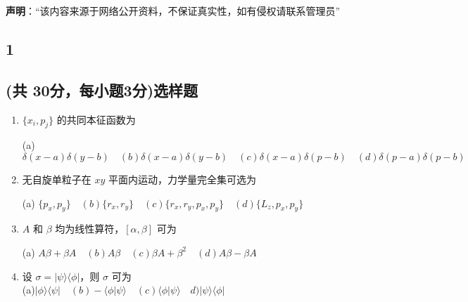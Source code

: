 
\textbf{声明}：“该内容来源于网络公开资料，不保证真实性，如有侵权请联系管理员”

\subsection{1}
\subsection{(共 30分，每小题3分)选样题}
\begin{enumerate}
    \item $\{x_i, p_j\}$ 的共同本征函数为 

(a) $\delta(x-a)\delta(y-b)\quad  (b) \delta(x-a)\delta(y-b) \quad (c) \delta(x-a)\delta(p-b) \quad (d) \delta(p-a)\delta(p-b)$

    
    \item 无自旋单粒子在 $xy$ 平面内运动，力学量完全集可选为 

(a) $\{p_x, p_y\} \quad (b) \{r_x, r_y\}\quad (c) \{r_x, r_y, p_x, p_y\}\quad (d) \{L_z, p_x, p_y\}$

    \item $A$ 和 $\beta$ 均为线性算符，$[\alpha, \beta]$ 可为 

(a) $A\beta + \beta A\quad (b) A\beta\quad (c) \beta A + \beta^2\quad (d) A\beta - \beta A$


    \item 设 $\sigma = |\psi\rangle \langle\phi|$，则 $\sigma$ 可为\\ 

(a)$|\phi\rangle \langle\psi| \quad (b) -\langle\phi|\psi\rangle \quad (c) \langle\phi|\psi\rangle\quad d) |\psi\rangle \langle\phi|$

\end{enumerate}

